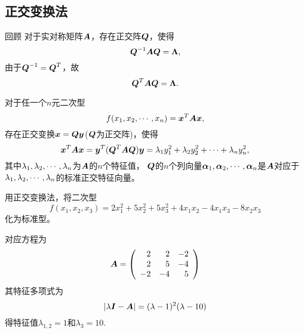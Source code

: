 
\subsection{正交变换法}


\begin{frame}
  
    \begin{block}{回顾}
      对于实对称矩阵$\boldsymbol{A}$，存在正交阵$\boldsymbol{Q}$，使得
      $$
      \boldsymbol{Q}^{-1}\boldsymbol{A}\boldsymbol{Q}=\boldsymbol{\Lambda},
      $$
      由于$\boldsymbol{Q}^{-1}=\boldsymbol{Q}^T$，故
      $$
      \boldsymbol{Q}^{T}\boldsymbol{A}\boldsymbol{Q}=\boldsymbol{\Lambda}.
      $$
    \end{block}
  
\end{frame}

\begin{frame}
  
    \begin{dingyi}[主轴定理]
      对于任一个$n$元二次型
      $$
      f(x_1,x_2,\cdots,x_n)={\boldsymbol{x}}^T\boldsymbol{A}{\boldsymbol{x}},
      $$
      存在正交变换${\boldsymbol{x}}=\boldsymbol{Q}{\boldsymbol{y}}$($\boldsymbol{Q}$为正交阵)，使得
      $$
      {\boldsymbol{x}}^T\boldsymbol{A}{\boldsymbol{x}}={\boldsymbol{y}}^T(\boldsymbol{Q}^T\boldsymbol{A}\boldsymbol{Q}){\boldsymbol{y}}=\lambda_1y_1^2+\lambda_2y_2^2+\cdots+\lambda_ny_n^2,
      $$
      其中$\lambda_1,\lambda_2,\cdots,\lambda_n$为$\boldsymbol{A}$的$n$个特征值，
      $\boldsymbol{Q}$的$n$个列向量$\boldsymbol{\alpha}_1,\boldsymbol{\alpha}_2,\cdots,\boldsymbol{\alpha}_n$是$\boldsymbol{A}$对应于$\lambda_1,\lambda_2,\cdots,\lambda_n$的标准正交特征向量。
    \end{dingyi}
  
\end{frame}



\begin{frame}
  
    \begin{li}
      用正交变换法，将二次型
      $$
      f(x_1,x_2,x_3)=2x_1^2+5x_2^2+5x_3^2+4x_1x_2-4x_1x_3-8x_2x_3
      $$
      化为标准型。
    \end{li}
    \pause
    \begin{jie}
    对应方程为
    $$
    \boldsymbol{A}=\left(
    \begin{array}{rrr}
      2&2&-2\\
      2&5&-4\\
      -2&-4&5
    \end{array}
    \right)
    $$
    \pause
    其特征多项式为
    $$
    |\lambda\boldsymbol{I}-\boldsymbol{A}|=(\lambda-1)^2(\lambda-10)
    $$
    得特征值$\lambda_{1,2}=1$和$\lambda_3=10$.
  \end{jie}
\end{frame}


